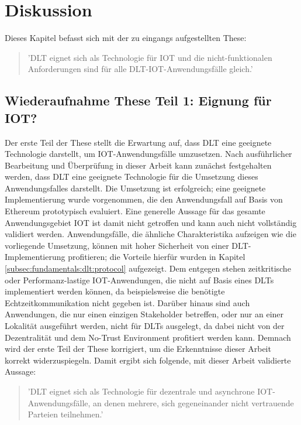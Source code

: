 \chapter{Diskussion}
\label{ch:discussion}
Dieses Kapitel befasst sich mit der zu eingangs aufgestellten These:
\begin{quote}
  '\ac{DLT} eignet sich als Technologie für \ac{IOT} und die nicht-funktionalen Anforderungen sind für alle \ac{DLT}-\ac{IOT}-Anwendungsfälle gleich.'
\end{quote}


\section{Wiederaufnahme These Teil 1: Eignung für IOT?}
\label{sec:discussion:part1}
Der erste Teil der These stellt die Erwartung auf, dass \ac{DLT} eine geeignete Technologie darstellt, um \ac{IOT}-Anwendungsfälle umzusetzen. Nach ausführlicher Bearbeitung und Überprüfung in dieser Arbeit kann zunächst festgehalten werden, dass \ac{DLT} eine geeignete Technologie für die Umsetzung dieses Anwendungsfalles darstellt. Die Umsetzung ist erfolgreich; eine geeignete Implementierung wurde vorgenommen, die den Anwendungsfall auf Basis von Ethereum prototypisch evaluiert. Eine generelle Aussage für das gesamte Anwendungsgebiet \ac{IOT} ist damit nicht getroffen und kann auch nicht vollständig validiert werden. Anwendungsfälle, die ähnliche Charakteristika aufzeigen wie die vorliegende Umsetzung, können mit hoher Sicherheit von einer \ac{DLT}-Implementierung profitieren; die Vorteile hierfür wurden in Kapitel \ref{subsec:fundamentals:dlt:protocol} aufgezeigt. Dem entgegen stehen zeitkritische oder Performanz-lastige \ac{IOT}-Anwendungen, die nicht auf Basis eines \acp{DLT} implementiert werden können, da beispielsweise die benötigte Echtzeitkommunikation nicht gegeben ist. Darüber hinaus sind auch Anwendungen, die nur einen einzigen Stakeholder betreffen, oder nur an einer Lokalität ausgeführt werden, nicht für \acp{DLT} ausgelegt, da dabei nicht von der Dezentralität und dem No-Trust Environment profitiert werden kann. Demnach wird der erste Teil der These korrigiert, um die Erkenntnisse dieser Arbeit korrekt widerzuspiegeln. Damit ergibt sich folgende, mit dieser Arbeit validierte Aussage:
\begin{quote}
  '\ac{DLT} eignet sich als Technologie für dezentrale und asynchrone \ac{IOT}-Anwendungsfälle, an denen mehrere, sich gegeneinander nicht vertrauende Parteien teilnehmen.'
\end{quote}

